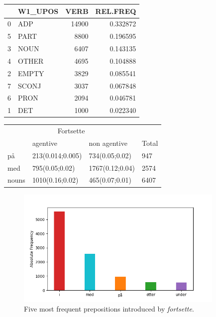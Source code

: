 \documentclass{article}
\begin{document}
\vspace{1cm}

\begin{minipage}{.3\textwidth}
  \centering
    \begin{tabular}{llrr}
    \toprule
    {} & W1\_UPOS &   VERB &  REL.FREQ \\
    \midrule
    0 &     ADP &  14900 &  0.332872 \\
    5 &    PART &   8800 &  0.196595 \\
    3 &    NOUN &   6407 &  0.143135 \\
    4 &   OTHER &   4695 &  0.104888 \\
    2 &   EMPTY &   3829 &  0.085541 \\
    7 &   SCONJ &   3037 &  0.067848 \\
    6 &    PRON &   2094 &  0.046781 \\
    1 &     DET &   1000 &  0.022340 \\
    \bottomrule
    \end{tabular}
\label{tab:fortsette_POS}
    \end{minipage}%
\hfill
\begin{minipage}{.5\textwidth}
  \centering
    \begin{tabular}{llll}
    \toprule
    \multicolumn{3}{c}{Fortsette}  \\
    
          & agentive & non agentive & Total\\
    \midrule    
    på    &  213(0.014;0.005)        &  734(0.05;0.02)  & 947         \\
    med   & 795(0.05;0.02)  & 1767(0.12;0.04) & 2574          \\
    nouns &  1010(0.16;0.02)         &  465(0.07;0.01)     & 6407     
    \end{tabular}
 \label{tab:fortsette_agentive}
\end{minipage}
\begin{figure}[htp]
    \centering
    \includegraphics[width=10cm]{pics/barplot_adp_fortsette.png}
    \caption{Five most frequent prepositions introduced by \emph{fortsette}.}
    \label{fig:barplot_pos_fortsette}
\end{figure}
\end{document}
